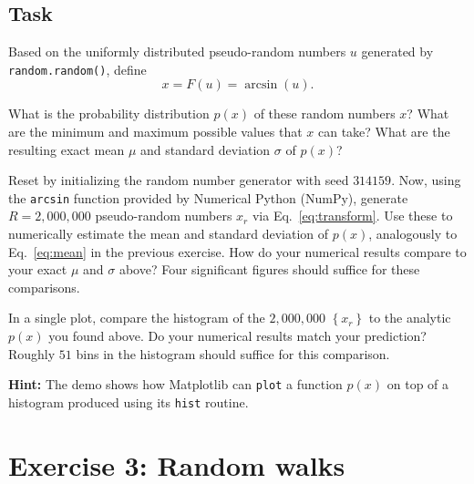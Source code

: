 \documentclass[12 pt]{article} %
\newcommand{\si}{\ensuremath{\sigma} }
\newcommand{\eq}[1]{Eq.~\ref{#1}}
\newcommand{\showmarks}[1]{\rightline{\texttt{[#1 marks]}}} %
\begin{document}
\newpage
\subsection*{Task}
Based on the uniformly distributed pseudo-random numbers $u$ generated by \texttt{random.random()}, define
\begin{equation}
  \label{eq:transform}
  x = F(u) = \arcsin\left(u\right).
\end{equation}

What is the probability distribution $p(x)$ of these random numbers $x$?
What are the minimum and maximum possible values that $x$ can take?
What are the resulting exact mean $\mu$ and standard deviation \si of $p(x)$?

\showmarks{5}

Reset by initializing the random number generator with seed $314159$.
Now, using the \texttt{arcsin} function provided by Numerical Python (NumPy), generate $R = 2{,}000{,}000$ pseudo-random numbers $x_r$ via \eq{eq:transform}.
Use these to numerically estimate the mean and standard deviation of $p(x)$, analogously to \eq{eq:mean} in the previous exercise.
How do your numerical results compare to your exact $\mu$ and \si above?
Four significant figures should suffice for these comparisons.

\showmarks{5}

In a single plot, compare the histogram of the $2{,}000{,}000$ $\left\{x_r\right\}$ to the analytic $p(x)$ you found above.
Do your numerical results match your prediction?
Roughly $51$ bins in the histogram should suffice for this comparison.

\textbf{Hint:} The demo shows how Matplotlib can \texttt{plot} a function $p(x)$ on top of a histogram produced using its \texttt{hist} routine.

\showmarks{5}



\newpage %
\section*{Exercise 3: Random walks}
\end{document}
